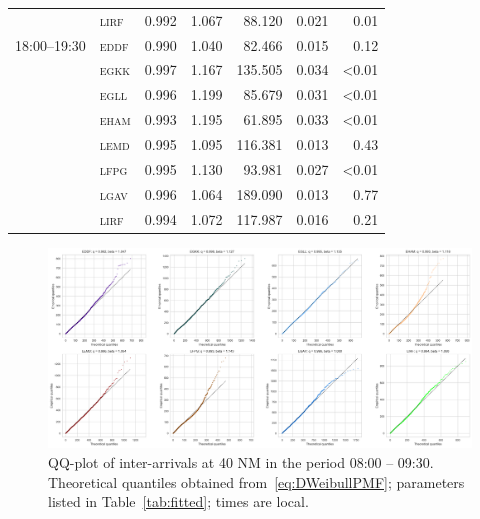\documentclass[draft,review]{elsarticle}
\newcommand{\airp}[1]{\textcolor{#1}{\textsc{#1}}}
\begin{document}
\begin{table}
\begin{tabular}{llrrrrr}
                   & \airp{lirf} & 0.992 &   1.067 &  88.120 &     0.021 &      0.01 \\
      18:00--19:30 & \airp{eddf} & 0.990 &   1.040 &  82.466 &     0.015 &      0.12 \\
                   & \airp{egkk} & 0.997 &   1.167 & 135.505 &     0.034 &     <0.01 \\
                   & \airp{egll} & 0.996 &   1.199 &  85.679 &     0.031 &     <0.01 \\
                   & \airp{eham} & 0.993 &   1.195 &  61.895 &     0.033 &     <0.01 \\
                   & \airp{lemd} & 0.995 &   1.095 & 116.381 &     0.013 &      0.43 \\
                   & \airp{lfpg} & 0.995 &   1.130 &  93.981 &     0.027 &     <0.01 \\
                   & \airp{lgav} & 0.996 &   1.064 & 189.090 &     0.013 &      0.77 \\
                   & \airp{lirf} & 0.994 &   1.072 & 117.987 &     0.016 &      0.21 \\
      \bottomrule
    \end{tabular}
\end{table}

\begin{figure}
    \includegraphics[width=\textwidth]{IA_qqplot0800-0930}
    \caption{QQ-plot of inter-arrivals at 40 NM in the period 08:00 -- 09:30. Theoretical quantiles obtained from~\eqref{eq:DWeibullPMF}; parameters listed in Table~\ref{tab:fitted}; times are local.}
    \label{fig:qqplot5-8}
\end{figure}
\end{document}
